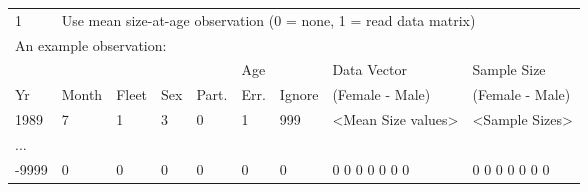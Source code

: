 \begin{center}
	\begin{tabular}{p{0.75cm} p{1cm} p{0.75cm} p{1cm} p{0.75cm} p{1cm} p{1cm} p{3.2cm} p{3.2cm}}
		\hline
		1 & \multicolumn{8}{l}{Use mean size-at-age observation (0 = none, 1 = read data matrix)} \Tstrut\\
		\multicolumn{9}{l}{An example observation:} \Bstrut\\
		\hline
		   &       &       &     &       & Age  &        & Data Vector     & Sample Size \Tstrut\\
		Yr & Month & Fleet & Sex & Part. & Err. & Ignore & (Female - Male) & (Female - Male) \Bstrut\\
		\hline
		1989  & 7 & 1 & 3 & 0 & 1 & 999 & <Mean Size values> & <Sample Sizes> \Tstrut\\
		...   &   &   &   &   &   &   &  & \\
		-9999 & 0 & 0 & 0 & 0 & 0 & 0 & 0 0 0 0 0 0 0 & 0 0 0 0 0 0 0 \Bstrut\\
		\hline
	\end{tabular}
\end{center}


